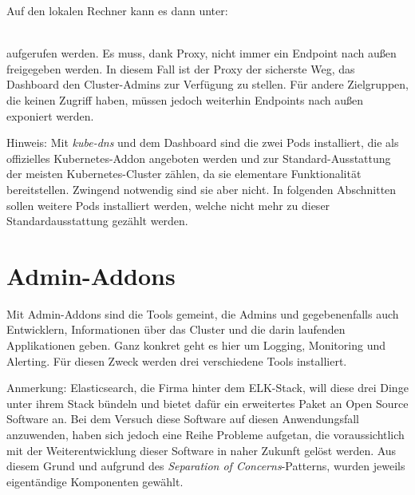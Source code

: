 Auf den lokalen Rechner kann es dann unter:
\\
 \\

aufgerufen werden. Es muss, dank Proxy, nicht immer ein Endpoint
nach außen freigegeben werden. In diesem Fall ist der Proxy der sicherste Weg,
das Dashboard den Cluster-Admins zur Verfügung zu stellen. Für andere Zielgruppen,
die keinen  Zugriff haben, müssen jedoch
weiterhin Endpoints nach außen exponiert werden.

\begin{tcolorbox}
  Hinweis: Mit \emph{kube-dns} und dem Dashboard sind die zwei Pods installiert,
  die als offizielles Kubernetes-Addon angeboten werden
  und zur Standard-Ausstattung der meisten Kubernetes-Cluster zählen, da
  sie elementare Funktionalität bereitstellen.
  Zwingend
  notwendig sind sie aber nicht.
  In folgenden Abschnitten sollen weitere Pods installiert werden, welche
  nicht mehr zu dieser Standardausstattung gezählt werden.
\end{tcolorbox}

\section{Admin-Addons}

Mit Admin-Addons sind die Tools gemeint, die Admins und gegebenenfalls auch
Entwicklern, Informationen über das Cluster und die darin laufenden
Applikationen geben.
Ganz konkret geht es hier um Logging, Monitoring und Alerting. Für diesen
Zweck werden drei verschiedene Tools installiert.

\begin{tcolorbox}
Anmerkung: Elasticsearch, die Firma hinter dem ELK-Stack, will diese drei Dinge
unter ihrem Stack bündeln und bietet dafür ein erweitertes Paket an Open Source
Software an. Bei dem Versuch diese Software auf diesen Anwendungsfall anzuwenden,
haben sich jedoch eine Reihe Probleme aufgetan, die voraussichtlich mit der
Weiterentwicklung
dieser Software in naher Zukunft gelöst werden. Aus diesem Grund und aufgrund des
\emph{Separation of Concerns}-Patterns, wurden jeweils eigentändige
Komponenten gewählt.
\end{tcolorbox}

